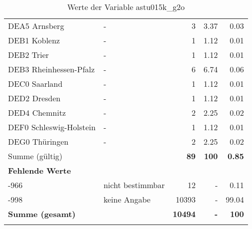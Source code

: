 \begin{longtable}{Xlrrr}
        \multicolumn{1}{X}{DEA5 Arnsberg} & - & \num{3} & \num[round-mode=places,round-precision=2]{3.37} & \num[round-mode=places,round-precision=2]{0.03} \\
        \multicolumn{1}{X}{DEB1 Koblenz} & - & \num{1} & \num[round-mode=places,round-precision=2]{1.12} & \num[round-mode=places,round-precision=2]{0.01} \\
        \multicolumn{1}{X}{DEB2 Trier} & - & \num{1} & \num[round-mode=places,round-precision=2]{1.12} & \num[round-mode=places,round-precision=2]{0.01} \\
        \multicolumn{1}{X}{DEB3 Rheinhessen-Pfalz} & - & \num{6} & \num[round-mode=places,round-precision=2]{6.74} & \num[round-mode=places,round-precision=2]{0.06} \\
        \multicolumn{1}{X}{DEC0 Saarland} & - & \num{1} & \num[round-mode=places,round-precision=2]{1.12} & \num[round-mode=places,round-precision=2]{0.01} \\
        \multicolumn{1}{X}{DED2 Dresden} & - & \num{1} & \num[round-mode=places,round-precision=2]{1.12} & \num[round-mode=places,round-precision=2]{0.01} \\
        \multicolumn{1}{X}{DED4 Chemnitz} & - & \num{2} & \num[round-mode=places,round-precision=2]{2.25} & \num[round-mode=places,round-precision=2]{0.02} \\
        \multicolumn{1}{X}{DEF0 Schleswig-Holstein} & - & \num{1} & \num[round-mode=places,round-precision=2]{1.12} & \num[round-mode=places,round-precision=2]{0.01} \\
        \multicolumn{1}{X}{DEG0 Thüringen} & - & \num{2} & \num[round-mode=places,round-precision=2]{2.25} & \num[round-mode=places,round-precision=2]{0.02} \\
     \midrule
      \multicolumn{2}{l}{Summe (gültig)} & \textbf{\num{89}} &
      \textbf{\num{100}} &
         \textbf{\num[round-mode=places,round-precision=2]{0.85}} \\
     \multicolumn{5}{l}{\textbf{Fehlende Werte}}\\
       -966 & nicht bestimmbar & \num{12} & - & \num[round-mode=places,round-precision=2]{0.11} \\

       -998 & keine Angabe & \num{10393} & - & \num[round-mode=places,round-precision=2]{99.04} \\

     \midrule
     \multicolumn{2}{l}{\textbf{Summe (gesamt)}} & \textbf{\num{10494}} & \textbf{-} & \textbf{\num{100}} \\
     \bottomrule
     \caption{Werte der Variable astu015k\_g2o}
     \end{longtable}
     
